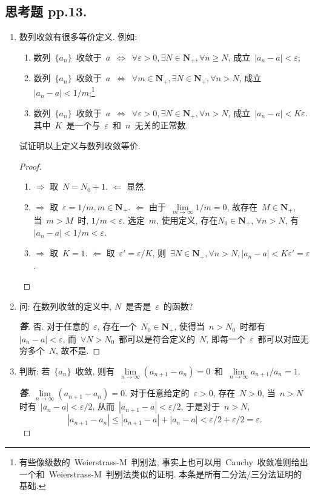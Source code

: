 \documentclass[UTF8,a4paper,10pt,twoside]{book}
\begin{document}
\subsection{思考题 pp.13.}
\kaishu
\begin{enumerate}
	\item 数列收敛有很多等价定义. 例如:
	      \begin{enumerate}[(1)]
		      \item 数列~$\{a_n\}$~收敛于~$a$~$\Longleftrightarrow$~$\forall\varepsilon>0,\exists N\in\mathbf{N}_{+},\forall n\geqslant N$, 成立~$|a_n-a|<\varepsilon$;
		      \item 数列~$\{a_n\}$~收敛于~$a$~$\Longleftrightarrow$~$\forall m\in\mathbf{N}_{+},\exists N\in\mathbf{N}_{+},\forall n>N$, 成立~$|a_n-a|<1/m$;\footnote{有些像级数的~Weierstrass-M~判别法, 事实上也可以用~Cauchy~收敛准则给出一个和~Weierstrass-M~判别法类似的证明. 本条是所有二分法/三分法证明的基础.}
		      \item 数列~$\{a_n\}$~收敛于~$a$~$\Longleftrightarrow$~$\forall\varepsilon>0,\exists N\in\mathbf{N}_{+},\forall n>N$, 成立~$|a_n-a|<K\varepsilon$. 其中~$K$~是一个与~$\varepsilon$~和~$n$~无关的正常数.
	      \end{enumerate}
	      试证明以上定义与数列收敛等价.

	      \begin{proof}
		      \begin{enumerate}[(1)]
			      \item $\Rightarrow$ 取~$N=N_0+1$. $\Leftarrow$ 显然.
			      \item $\Rightarrow$ 取~$\varepsilon=1/m, m\in\mathbf{N}_{+}$. $\Leftarrow$ 由于~$\lim\limits_{m\to\infty} 1/m=0$, 故存在~$M\in\mathbf{N}_{+}$, 当~$m>M$~时, $1/m<\varepsilon$. 选定~$m$, 使用定义, 存在$N_0\in\mathbf{N}_{+}$, $\forall n>N$, 有~$|a_n-a|<1/m<\varepsilon$.
			      \item $\Rightarrow$ 取~$K=1$. $\Leftarrow$ 取~$\varepsilon'=\varepsilon/K$, 则~$\exists N\in\mathbf{N}_{+}, \forall n>N, |a_n-a|<K\varepsilon'=\varepsilon$.\qedhere
		      \end{enumerate}
	      \end{proof}

	\item 问: 在数列收敛的定义中, $N$~是否是~$\varepsilon$~的函数?
	      \begin{proof}[\bf 答]
		      否. 对于任意的~$\varepsilon$, 存在一个~$N_0\in\mathbf{N}_{+}$, 使得当~$n>N_0$~时都有~$|a_n-a|<\varepsilon$, 而~$\forall N>N_0$~都可以是符合定义的~$N$, 即每一个~$\varepsilon$~都可以对应无穷多个~$N$, 故不是.\qedhere
	      \end{proof}
	\item 判断: 若~$\{a_n\}$~收敛, 则有~$\lim\limits_{n\to\infty} (a_{n+1}-a_n)=0$~和~$\lim\limits_{n\to\infty} a_{n+1}/a_n=1$.
	      \begin{proof}[\bf 答]
		      $\lim\limits_{n\to\infty} (a_{n+1}-a_n)=0$. 对于任意给定的~$\varepsilon>0$, 存在~$N>0$, 当~$n>N$时有~$|a_n-a|<\varepsilon/2$, 从而~$|a_{n+1}-a|<\varepsilon/2$, 于是对于~$n>N$,
		      \[
			      |a_{n+1}-a_n|\leqslant|a_{n+1}-a|+|a_n-a|<\varepsilon/2+\varepsilon/2=\varepsilon.
		      \]


\end{proof}
\end{enumerate}
\end{document}
